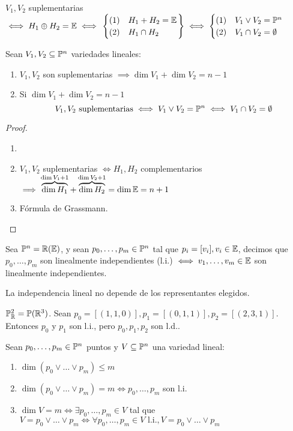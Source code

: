 \begin{obs}
    $V_1, V_2$ suplementarias $\iff H_1 \oplus H_2 = \mathbb{E} \iff \left. \begin{cases} (1) & H_1 + H_2 = \mathbb{E} \\ (2) & H_1 \cap H_2 \end{cases} \right\}
    \iff \begin{cases} (1) & V_1 \vee V_2 = \mathbb{P}^n \\ (2) & V_1 \cap V_2 = \emptyset \end{cases}$
\end{obs}
\begin{prop}
    Sean $V_1, V_2 \subseteq \mathbb{P}^n$ variedades lineales:
    \begin{enumerate}
        \item $V_1, V_2$ son suplementarias $\implies \dim V_1 + \dim V_2 = n-1$
        \item Si $\dim V_1 + \dim V_2 = n-1$
        \[
        V_1, V_2 \text{ suplementarias} \iff V_1 \vee V_2 = \mathbb{P}^n \iff V_1 \cap V_2 = \emptyset
        \]
    \end{enumerate}
\end{prop}
\begin{proof}
    \begin{enumerate}
        \item[]
        \item $V_1, V_2$ suplementarias $\iff H_1, H_2$ complementarios $\implies \overbrace{\dim H_1}^{\dim V_1 + 1} +
        \overbrace{\dim H_2}^{\dim V_2 + 1} = \dim \mathbb{E} = n+1$
        \item Fórmula de Grassmann.
    \end{enumerate}
\end{proof}
\begin{defi}
    Sea $\mathbb{P}^n = \mathbb{R}(\mathbb{E} )$, y sean $p_0, \dots, p_m \in \mathbb{P}^n$ tal que $p_i = [v_i], v_i \in \mathbb{E}$, decimos que $p_0, \dots,
    p_m$ son linealmente independientes (l.i.) $\iff v_1, \dots, v_m \in \mathbb{E}$ son linealmente independientes.
\end{defi}
\begin{obs}
    La independencia lineal no depende de los representantes elegidos.
\end{obs}
\begin{example}
    $\mathbb{P}^2_{\mathbb{R}} = \mathbb{P}(\mathbb{R}^3)$. Sean $p_0 = [(1,1,0)], p_1 = [(0,1,1)], p_2 = [(2,3,1)]$. Entonces $p_0$ y $p_1$ son l.i.,
    pero $p_0, p_1, p_2$ son l.d..
\end{example}
\begin{prop}
    Sean $p_0, \dots, p_m \in \mathbb{P}^n$ puntos y $V \subseteq \mathbb{P}^n$ una variedad lineal:
    \begin{enumerate}
        \item $\dim\left( p_0 \vee \dots \vee p_m \right) \leq m$
        \item $\dim\left( p_0 \vee \dots \vee p_m \right) = m \iff p_0, \dots, p_m$ son l.i.
        \item $\dim V = m \iff \exists p_0, \dots, p_m \in V$ tal que $V = p_0 \vee \dots \vee p_m
            \iff \forall p_0, \dots, p_m \in V \text{ l.i.}, V = p_0 \vee \dots \vee p_m$
    \end{enumerate}
\end{prop}
